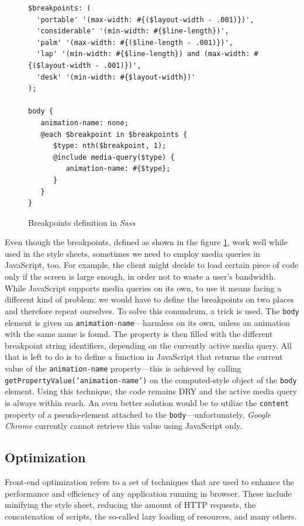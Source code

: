 \documentclass[thesis=M,english,hidelinks]{FITthesis}[2012/10/20]
\newcommand{\code}{\texttt}
\begin{document}
\begin{figure}[h]
  \begin{lstlisting}
$breakpoints: (
  'portable' '(max-width: #{($layout-width - .001)})',
  'considerable' '(min-width: #{$line-length})',
  'palm' '(max-width: #{($line-length - .001)})',
  'lap' '(min-width: #{$line-length}) and (max-width: #{($layout-width - .001)})',
  'desk' '(min-width: #{$layout-width})'
);

body {
   animation-name: none;
   @each $breakpoint in $breakpoints {
      $type: nth($breakpoint, 1);
      @include media-query($type) {
         animation-name: #{$type};
      }
   }
}
  \end{lstlisting}
  \caption{Breakpoints definition in \textit{Sass}}
  \label{fig:sass_breakpoints}
\end{figure}

Even though the breakpoints, defined as shown in the figure \ref{fig:sass_breakpoints}, work well while used in the style sheets, sometimes we need to employ media queries in JavaScript, too. For example, the client might decide to load certain piece of code only if the screen is large enough, in order not to waste a user's bandwidth. While JavaScript supports media queries on its own, to use it means facing a different kind of problem: we would have to define the breakpoints on two places and therefore repeat ourselves. To solve this conundrum, a trick is used. The \code{body} element is given an \code{animation-name}---harmless on its own, unless an animation with the same name is found. The property is then filled with the different breakpoint string identifiers, depending on the currently active media query. All that is left to do is to define a function in JavaScript that returns the current value of the \code{animation-name} property---this is achieved by calling \code{getPropertyValue('animation-name')} on the computed-style object of the \code{body} element. Using this technique, the code remains DRY and the active media query is always within reach. An even better solution would be to utilize the \code{content} property of a pseudo-element attached to the \code{body}---unfortunately, \textit{Google Chrome} currently cannot retrieve this value using JavaScript only.

  \subsection{Optimization}

Front-end optimization refers to a set of techniques that are used to enhance the performance and efficiency of any application running in browser. These include  minifying the style sheet, reducing the amount of HTTP requests, the concatenation of scripts, the so-called lazy loading of resources, and many others.
\end{document}

